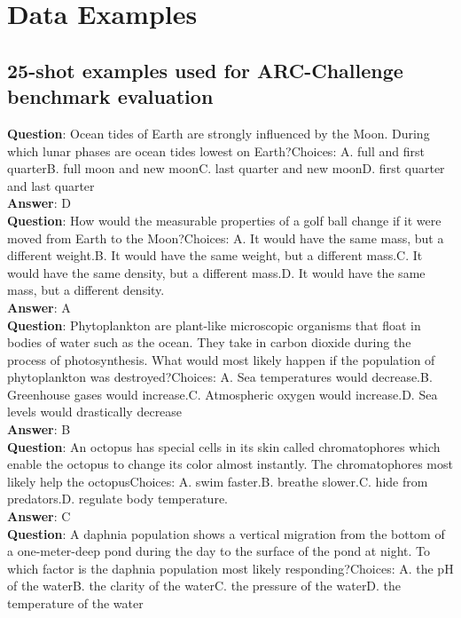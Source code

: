 \small
\chapter{Data Examples} %

\section{25-shot examples used for ARC-Challenge benchmark evaluation} \label{25shot}
\textbf{Question}: Ocean tides of Earth are strongly influenced by the Moon. During which lunar phases are ocean tides lowest on Earth?Choices: A. full and first quarterB. full moon and new moonC. last quarter and new moonD. first quarter and last quarter\\
\textbf{Answer}: D\\
\textbf{Question}: How would the measurable properties of a golf ball change if it were moved from Earth to the Moon?Choices: A. It would have the same mass, but a different weight.B. It would have the same weight, but a different mass.C. It would have the same density, but a different mass.D. It would have the same mass, but a different density.\\
\textbf{Answer}: A\\
\textbf{Question}: Phytoplankton are plant-like microscopic organisms that float in bodies of water such as the ocean. They take in carbon dioxide during the process of photosynthesis. What would most likely happen if the population of phytoplankton was destroyed?Choices: A. Sea temperatures would decrease.B. Greenhouse gases would increase.C. Atmospheric oxygen would increase.D. Sea levels would drastically decrease \\
\textbf{Answer}: B\\
\textbf{Question}: An octopus has special cells in its skin called chromatophores which enable the octopus to change its color almost instantly. The chromatophores most likely help the octopusChoices: A. swim faster.B. breathe slower.C. hide from predators.D. regulate body temperature.\\
\textbf{Answer}: C\\
\textbf{Question}: A daphnia population shows a vertical migration from the bottom of a one-meter-deep pond during the day to the surface of the pond at night. To which factor is the daphnia population most likely responding?Choices: A. the pH of the waterB. the clarity of the waterC. the pressure of the waterD. the temperature of the water\\
